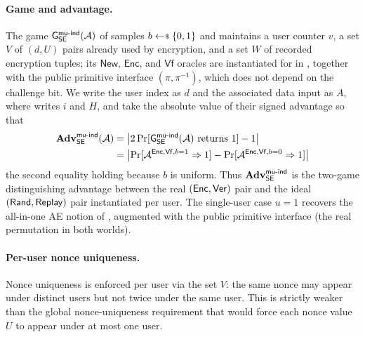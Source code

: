 \paragraph{Game and advantage.}
The game $\mathsf{G}^{\mathsf{mu\text{-}ind}}_{\mathsf{SE}}(\mathcal{A})$ of
\cite[Fig.~3]{BT16} samples $b \sample \bits$ and maintains a user
counter $v$, a set $V$ of $(d, U)$ pairs already used by encryption,
and a set $W$ of recorded encryption tuples; its $\mathsf{New}$,
$\mathsf{Enc}$, and $\mathsf{Vf}$ oracles are instantiated for \TW{} in
, together with the public primitive interface
$(\pi,\pi^{-1})$, which does not depend on the challenge bit. We write
the user index as $d$ and the
associated data input as $A$, where \cite{BT16} writes $i$ and $H$, and
take the absolute value of their signed advantage so that
\[
  \begin{aligned}
  \mathbf{Adv}^{\mathsf{mu\text{-}ind}}_{\mathsf{SE}}(\mathcal{A})
  &= \left|2 \Pr[\mathsf{G}^{\mathsf{mu\text{-}ind}}_{\mathsf{SE}}(\mathcal{A})
          \text{ returns } 1] - 1\right| \\
  &= \bigl|
      \Pr[\mathcal{A}^{\mathsf{Enc}, \mathsf{Vf}, b=1} \Rightarrow 1]
      - \Pr[\mathcal{A}^{\mathsf{Enc}, \mathsf{Vf}, b=0} \Rightarrow 1]
    \bigr|
  \end{aligned}
\]
the second equality holding because $b$ is uniform. Thus
$\mathbf{Adv}^{\mathsf{mu\text{-}ind}}_{\mathsf{SE}}$ is the two-game distinguishing advantage between the
real $(\mathsf{Enc}, \mathsf{Ver})$ pair and the ideal $(\mathsf{Rand}, \mathsf{Replay})$ pair
instantiated per user. The single-user case $u = 1$ recovers the
all-in-one AE notion of , augmented with the public
primitive interface (the real permutation in both worlds).

\paragraph{Per-user nonce uniqueness.}
Nonce uniqueness is enforced per user via the set $V$: the same nonce
may appear under distinct users but not twice under the same user.
This is strictly weaker than the global nonce-uniqueness requirement
that would force each nonce value $U$ to appear under at most one user.
